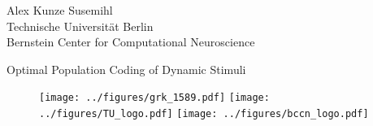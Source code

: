 \documentclass[10pt]{article}
\begin{document}
\begin{center}

\Large{Alex Kunze Susemihl}\\
\vspace{10pt}
\large{Technische Universit\"{a}t Berlin\\
Bernstein Center for Computational Neuroscience}

\vspace{100pt}

\Huge{Optimal Population Coding of Dynamic Stimuli}
\vspace{20pt}
\begin{figure}[h]
\texttt{[image: ../figures/grk\_1589.pdf]}
\texttt{[image: ../figures/TU\_logo.pdf]}
\texttt{[image: ../figures/bccn\_logo.pdf]}
\end{figure}

\date{}

\end{center}
\end{document}
